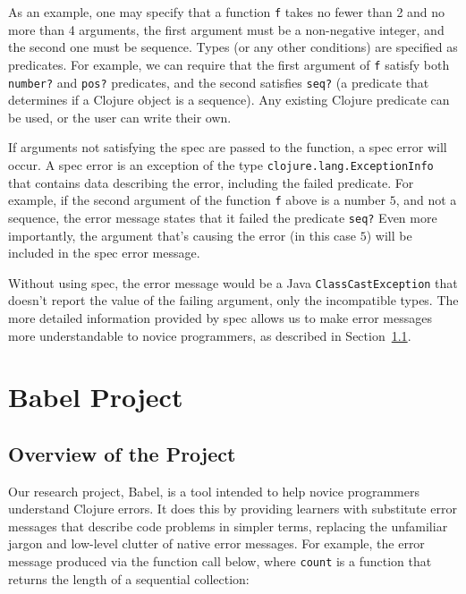 \documentclass[12pt]{article}
\newcommand{\comment}[1]{{\bf \tt  {#1}}}
\newcommand{\emcomment}[1]{\textcolor{ForestGreen}{\comment{Elena: {#1}}}}
\newcommand{\jscomment}[1]{\textcolor{olive}{\comment{Jaydon: {#1}}}}
\begin{document}
As an example, one may specify that a function \texttt{f} takes no fewer than 2 and no more than 4 arguments, the first argument must be a non-negative integer, and the second one must be sequence. 
Types (or any other conditions) are specified as predicates. 
For example, we can require that the first argument of \texttt{f} satisfy both \texttt{number?} and \texttt{pos?} predicates, and the second satisfies \texttt{seq?} (a predicate that determines if a Clojure object is a sequence).
Any existing Clojure predicate can be used, or the user can write their own. 

If arguments not satisfying the spec are passed to the function, a spec error will occur. 
A spec error is an exception of the type \texttt{clojure.lang.ExceptionInfo} that contains data describing the error, including the failed predicate.
For example, if the second argument of the function 
\texttt{f} above is a number $5$, and not a sequence, the error message states that it failed the predicate \texttt{seq?}
Even more importantly, the argument that's causing the error (in this case $5$) will be included in the spec error message.

Without using spec, the error message would be a Java \texttt{ClassCastException} that doesn't report the value of the failing argument, only the incompatible types. 
The more detailed information provided by spec allows us to make error messages more understandable to novice programmers, as described in Section~\ref{subsec:overview}. 

\section{Babel Project}\label{sec:babel}
\subsection{Overview of the Project}\label{subsec:overview}
Our research project, Babel, is a tool intended to help novice programmers understand Clojure errors. It does this by providing learners with substitute error messages that describe code problems in simpler terms, replacing the unfamiliar jargon and low-level clutter of native error messages. For example, the error message produced via the function call below, where \texttt{count} is a function that returns the length of a sequential collection: %
\end{document}
